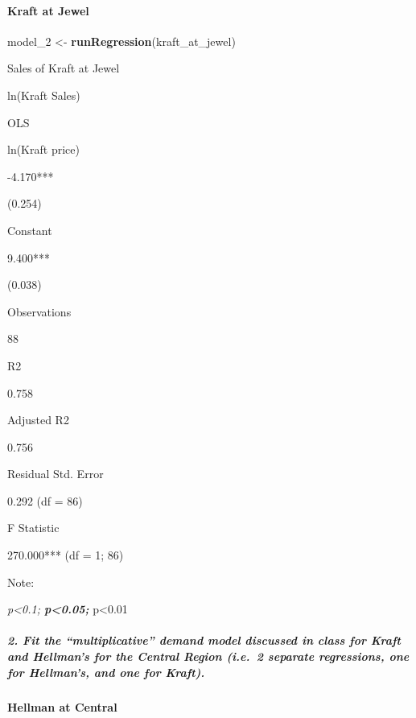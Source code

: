 \documentclass[]{article}
\newenvironment{Shaded}{\begin{snugshade}}{\end{snugshade}}
\newcommand{\DecValTok}[1]{\textcolor[rgb]{0.00,0.00,0.81}{#1}}
\newcommand{\KeywordTok}[1]{\textcolor[rgb]{0.13,0.29,0.53}{\textbf{#1}}}
\newcommand{\NormalTok}[1]{#1}
\newcommand{\StringTok}[1]{\textcolor[rgb]{0.31,0.60,0.02}{#1}}
\let\oldparagraph\paragraph
\renewcommand{\paragraph}[1]{\oldparagraph{#1}\mbox{}}
\let\oldsubparagraph\subparagraph
\renewcommand{\subparagraph}[1]{\oldsubparagraph{#1}\mbox{}}
\begin{document}
\hypertarget{kraft-at-jewel}{%
\paragraph{Kraft at Jewel}\label{kraft-at-jewel}}

\begin{Shaded}
\begin{Highlighting}[]
\NormalTok{model_}\DecValTok{2}\NormalTok{ <-}\StringTok{ }\KeywordTok{runRegression}\NormalTok{(kraft_at_jewel)}
\end{Highlighting}
\end{Shaded}

Sales of Kraft at Jewel

ln(Kraft Sales)

OLS

ln(Kraft price)

-4.170***

(0.254)

Constant

9.400***

(0.038)

Observations

88

R2

0.758

Adjusted R2

0.756

Residual Std. Error

0.292 (df = 86)

F Statistic

270.000*** (df = 1; 86)

Note:

\emph{p\textless{}0.1; \textbf{p\textless{}0.05; }}p\textless{}0.01

\hypertarget{fit-the-multiplicative-demand-model-discussed-in-class-for-kraft-and-hellmans-for-the-central-region-i.e.2-separate-regressions-one-for-hellmans-and-one-for-kraft.}{%
\subparagraph{2. Fit the ``multiplicative'' demand model discussed in
class for Kraft and Hellman's for the Central Region (i.e.~2 separate
regressions, one for Hellman's, and one for
Kraft).}\label{fit-the-multiplicative-demand-model-discussed-in-class-for-kraft-and-hellmans-for-the-central-region-i.e.2-separate-regressions-one-for-hellmans-and-one-for-kraft.}}

\hypertarget{hellman-at-central}{%
\paragraph{Hellman at Central}\label{hellman-at-central}}
\end{document}
